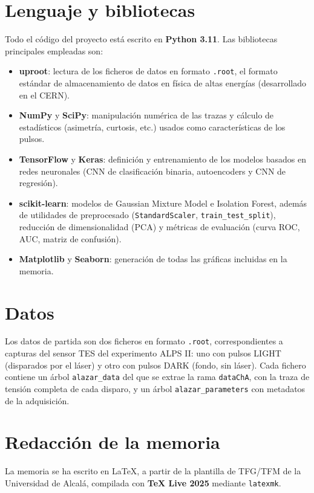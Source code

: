 \section{Lenguaje y bibliotecas}
\label{sec:lenguaje-bibliotecas}

Todo el código del proyecto está escrito en \textbf{Python 3.11}. Las bibliotecas principales empleadas son:

\begin{itemize}
	\item \textbf{uproot}: lectura de los ficheros de datos en formato \texttt{.root}, el formato estándar de almacenamiento de datos en física de altas energías (desarrollado en el CERN).
	\item \textbf{NumPy} y \textbf{SciPy}: manipulación numérica de las trazas y cálculo de estadísticos (asimetría, curtosis, etc.) usados como características de los pulsos.
	\item \textbf{TensorFlow} y \textbf{Keras}: definición y entrenamiento de los modelos basados en redes neuronales (CNN de clasificación binaria, autoencoders y CNN de regresión).
	\item \textbf{scikit-learn}: modelos de Gaussian Mixture Model e Isolation Forest, además de utilidades de preprocesado (\texttt{StandardScaler}, \texttt{train\_test\_split}), reducción de dimensionalidad (PCA) y métricas de evaluación (curva ROC, AUC, matriz de confusión).
	\item \textbf{Matplotlib} y \textbf{Seaborn}: generación de todas las gráficas incluidas en la memoria.
\end{itemize}

\section{Datos}
\label{sec:datos-herramientas}

Los datos de partida son dos ficheros en formato \texttt{.root}, correspondientes a capturas del sensor TES del experimento ALPS II: uno con pulsos LIGHT (disparados por el láser) y otro con pulsos DARK (fondo, sin láser). Cada fichero contiene un árbol \texttt{alazar\_data} del que se extrae la rama \texttt{dataChA}, con la traza de tensión completa de cada disparo, y un árbol \texttt{alazar\_parameters} con metadatos de la adquisición.

\section{Redacción de la memoria}
\label{sec:redaccion-memoria}

La memoria se ha escrito en \LaTeX{}, a partir de la plantilla de TFG/TFM de la Universidad de Alcalá, compilada con \textbf{TeX Live 2025} mediante \texttt{latexmk}.


